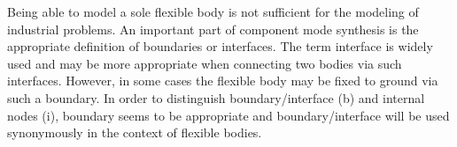 %


Being able to model a sole flexible body is not sufficient for the modeling of industrial problems.
An important part of component mode synthesis is the appropriate definition of boundaries or interfaces.
The term interface is widely used and may be more appropriate when connecting two bodies via such interfaces.
However, in some cases the flexible body may be fixed to ground via such a boundary. In order to distinguish boundary/interface (b) and internal nodes (i), boundary seems to be appropriate and boundary/interface will be used synonymously in the context of flexible bodies.

